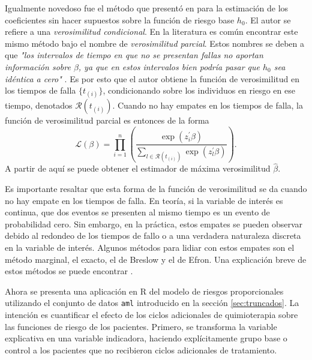 \documentclass[11pt,a4paper]{article}
\begin{document}
Igualmente novedoso fue el método que presentó en \citet{cox} para la estimación de los coeficientes sin hacer supuestos sobre la función de riesgo base $h_0$. El autor se refiere a una \textit{verosimilitud condicional}. En la literatura es común encontrar este mismo método bajo el nombre de \textit{verosimilitud parcial}. Estos nombres se deben a que \textit{"los intervalos de tiempo en que no se presentan fallas no aportan información sobre $\beta$, ya que en estos intervalos bien podría pasar que $h_0$ sea idéntica a cero"} \citep{cox}. Es por esto que el autor obtiene la función de verosimilitud en los tiempos de falla $\lbrace t_{(i)} \rbrace$, condicionando sobre los individuos en riesgo en ese tiempo, denotados $\mathcal{R}(t_{(i)})$. Cuando no hay empates en los tiempos de falla, la función de verosimilitud parcial es entonces de la forma
$$\mathcal{L}(\beta) = \prod_{i=1}^n \left(\frac{\exp (z_i^\prime \beta)}{\sum_{l\in \mathcal{R}(t_{(i)})}\exp (z_l^\prime \beta)}\right).$$ A partir de aquí se puede obtener el estimador de máxima verosimilitud $\hat{\beta}$.

Es importante resaltar que esta forma de la función de verosimilitud se da cuando no hay empate en los tiempos de falla. En teoría, si la variable de interés es continua, que dos eventos se presenten al mismo tiempo es un evento de probabilidad cero. Sin embargo, en la práctica, estos empates se pueden observar debido al redondeo de los tiempos de fallo o a una verdadera naturaleza discreta en la variable de interés. Algunos métodos para lidiar con estos empates son el método marginal, el exacto, el de Breslow y el de Efron. Una explicación breve de estos métodos se puede encontrar \citet{moore}.

Ahora se presenta una aplicación en R del modelo de riesgos proporcionales utilizando el conjunto de datos \texttt{aml} introducido en la sección \ref{sec:truncados}. La intención es cuantificar el efecto de los ciclos adicionales de quimioterapia sobre las funciones de riesgo de los pacientes. Primero, se transforma la variable explicativa en una variable indicadora, haciendo explícitamente grupo base o control a los pacientes que no recibieron ciclos adicionales de tratamiento.
\end{document}
